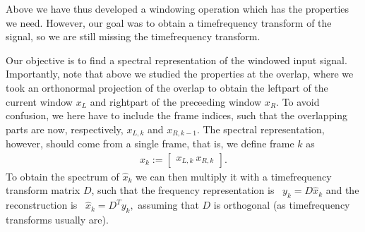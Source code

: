 \documentclass[letterpaper,10pt,english]{jupyterBook}
\begin{document}
\sphinxAtStartPar
Above we have thus developed a windowing operation which has the
properties we need. However, our goal was to obtain a time\sphinxhyphen{}frequency
transform of the signal, so we are still missing the time\sphinxhyphen{}frequency
transform.

\sphinxAtStartPar
Our objective is to find a spectral representation of the windowed input
signal. Importantly, note that above we studied the properties at the
overlap, where we took an orthonormal projection of the overlap to
obtain the left\sphinxhyphen{}part of the current window \(x_{L}\) and
right\sphinxhyphen{}part of the preceeding window \(x_{R}\). To avoid confusion,
we here have to include the frame indices, such that the overlapping
parts are now, respectively, \(x_{L,k}\) and \(x_{R,k-1}\).
The spectral representation, however, should come from a single frame,
that is, we define frame \(k\) as
\begin{equation*}
\begin{split} \widehat x_k := \begin{bmatrix}x_{L,k} \ x_{R,k}
\end{bmatrix}. \end{split}
\end{equation*}
\sphinxAtStartPar
To obtain the spectrum of \( \widehat x_k \) we can then multiply it
with a time\sphinxhyphen{}frequency transform matrix \(D\), such that the frequency
representation is  \( y_k=D\widehat x_k \) and the reconstruction
is  \( \widehat x_k = D^T y_k, \) assuming that \(D\)
is orthogonal (as time\sphinxhyphen{}frequency transforms usually are).
\end{document}
